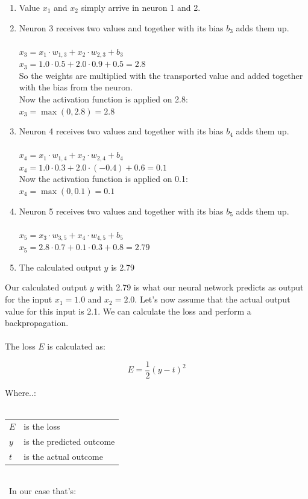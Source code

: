 \documentclass[a4paper,12pt]{report}
\begin{document}
\begin{enumerate}
  \item Value $x_1$ and $x_2$ simply arrive in neuron 1 and 2.
  \item Neuron 3 receives two values and together with its bias $b_3$ adds them up.\\\\
  $x_3 = x_1 \cdot w_{1,3} + x_2 \cdot w_{2,3} + b_3$ \\
  $x_3 = 1.0 \cdot 0.5 + 2.0 \cdot 0.9 + 0.5 = 2.8$\\
  So the weights are multiplied with the transported value and added together with the bias from the neuron.\\
  Now the activation function is applied on 2.8: \\
  $x_3 = \max(0, 2.8) = 2.8$
  
  \item Neuron 4 receives two values and together with its bias $b_4$ adds them up.\\\\
  $x_4 = x_1 \cdot w_{1,4} + x_2 \cdot w_{2,4} + b_4$ \\
  $x_4 = 1.0 \cdot 0.3 + 2.0 \cdot (-0.4) + 0.6 = 0.1$\\
  Now the activation function is applied on 0.1: \\
  $x_4 = \max(0, 0.1) = 0.1$
  
  \item Neuron 5 receives two values and together with its bias $b_5$ adds them up.\\\\
  $x_5 = x_3 \cdot w_{3,5} + x_4 \cdot w_{4,5} + b_5$ \\
  $x_5 = 2.8 \cdot 0.7 + 0.1 \cdot 0.3 + 0.8 = 2.79$
  
  \item The calculated output $y$ is 2.79
\end{enumerate}
\noindent
Our calculated output $y$ with 2.79 is what our neural network predicts as output for the input $x_1 = 1.0$ and $x_2 = 2.0$. Let’s now assume that the actual output value for this input is 2.1. We can calculate the loss and perform a backpropagation.\\\\
\noindent
The loss $E$ is calculated as:

\[
E = \frac{1}{2}(y - t)^2
\]

\noindent
Where..:\\\\
\medskip
\begin{tabular}{@{}l@{\,--\,}l}
  $E$         \hspace*{2em} & \hspace*{2em} is the loss \\
  $y$         \hspace*{2em} & \hspace*{2em} is the predicted outcome \\
  $t$         \hspace*{2em} & \hspace*{2em} is the actual outcome \\
\end{tabular}\\
\
In our case that’s:
\end{document}
